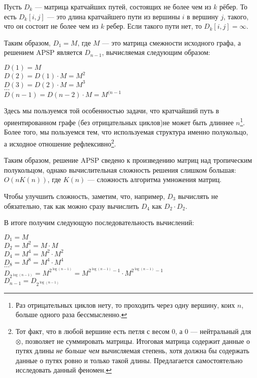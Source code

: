 Пусть $D_k$ --- матрица кратчайших путей, состоящих не более чем из $k$ рёбер. То есть $D_k[i,j]$ --- это длина кратчайшего пути из вершины $i$ в вершину $j$, такого, что он состоит не более чем из $k$ ребер. Если такого пути нет, то $D_k[i,j] = \infty$.

Таким образом, $D_1 = M$, где $M$ --- это матрица смежности исходного графа, а решением APSP является $D_{n-1}$, вычисляемая следующим образом: 

\begin{center}
    $D(1) = M$ \\
    $D(2) = D(1) \cdot M = M^2$ \\
    $D(3) = D(2) \cdot M = M^3$ \\
    $\dots$ \\
    $D(n-1) = D(n-2) \cdot M = M^{(n - 1}$ \\
\end{center}

Здесь мы пользуемся той особенностью задачи, что кратчайший путь в ориентированном графе (без отрицательных циклов)не может быть длиннее $n$\footnote{Раз отрицательных циклов нету, то проходить через одну вершину, коих $n$, больше одного раза бессмысленно.}. 
Более того, мы пользуемся тем, что используемая структура именно полукольцо, а исходное отношение рефлексивно\footnote{Тот факт, что в любой вершине есть петля с весом 0, а 0 --- нейтральный для $\otimes$, позволяет не суммировать матрицы. Итоговая матрица содержит данные о путях длины \textit{не больше чем} вычисляемая степень, хотя должна бы содержать данные о путях ровно и только такой длины. Предлагается самостоятельно исследовать данный феномен.}. 

Таким образом, решение APSP сведено к произведению матриц над тропическим полукольцом, однако вычислительная сложность решения слишком большая: $O(n K(n))$, где $K(n)$ --- сложность алгоритма умножения матриц.

Чтобы улучшить сложность, заметим, что, например, $D_3$ вычислять не обязательно, так как можно сразу вычислить $D_4$ как $D_2 \cdot D_2$.

В итоге получим следующую последовательность вычислений:

\begin{center}
    $D_1 = M$ \\
    $D_2 = M^2 = M \cdot M$ \\
    $D_4 = M^4 = M^2 \cdot M^2$ \\
    $D_8 = M^8 = M^4 \cdot M^4$ \\
    $\dots$ \\
    $D_{2^{\log(n-1)}} = M^{2^{\log(n-1)}} = M^{2^{\log(n-1)} - 1} \cdot M^{2^{\log(n-1)} - 1}$ \\
    $D_{n-1} = D_{2^{\log(n-1)}}$ \\
\end{center}

